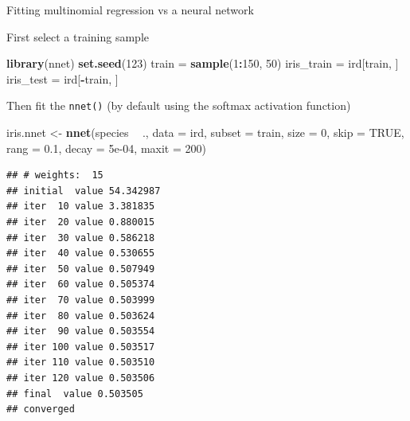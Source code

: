 \documentclass[10pt,ignorenonframetext,]{beamer}
\newenvironment{Shaded}{\begin{snugshade}}{\end{snugshade}}
\newcommand{\DataTypeTok}[1]{\textcolor[rgb]{0.13,0.29,0.53}{#1}}
\newcommand{\DecValTok}[1]{\textcolor[rgb]{0.00,0.00,0.81}{#1}}
\newcommand{\FloatTok}[1]{\textcolor[rgb]{0.00,0.00,0.81}{#1}}
\newcommand{\KeywordTok}[1]{\textcolor[rgb]{0.13,0.29,0.53}{\textbf{#1}}}
\newcommand{\NormalTok}[1]{#1}
\newcommand{\OperatorTok}[1]{\textcolor[rgb]{0.81,0.36,0.00}{\textbf{#1}}}
\newcommand{\OtherTok}[1]{\textcolor[rgb]{0.56,0.35,0.01}{#1}}
\newcommand{\StringTok}[1]{\textcolor[rgb]{0.31,0.60,0.02}{#1}}
\begin{document}
\begin{frame}[fragile]

\begin{block}{Fitting multinomial regression vs a neural network}

First select a training sample

\scriptsize

\begin{Shaded}
\begin{Highlighting}[]
\KeywordTok{library}\NormalTok{(nnet)}
\KeywordTok{set.seed}\NormalTok{(}\DecValTok{123}\NormalTok{)}
\NormalTok{train =}\StringTok{ }\KeywordTok{sample}\NormalTok{(}\DecValTok{1}\OperatorTok{:}\DecValTok{150}\NormalTok{, }\DecValTok{50}\NormalTok{)}
\NormalTok{iris_train =}\StringTok{ }\NormalTok{ird[train, ]}
\NormalTok{iris_test =}\StringTok{ }\NormalTok{ird[}\OperatorTok{-}\NormalTok{train, ]}
\end{Highlighting}
\end{Shaded}

\normalsize

Then fit the \texttt{nnet()} (by default using the softmax activation
function)

\scriptsize

\begin{Shaded}
\begin{Highlighting}[]
\NormalTok{iris.nnet <-}\StringTok{ }\KeywordTok{nnet}\NormalTok{(species }\OperatorTok{~}\StringTok{ }\NormalTok{., }\DataTypeTok{data =}\NormalTok{ ird, }\DataTypeTok{subset =}\NormalTok{ train, }\DataTypeTok{size =} \DecValTok{0}\NormalTok{, }
    \DataTypeTok{skip =} \OtherTok{TRUE}\NormalTok{, }\DataTypeTok{rang =} \FloatTok{0.1}\NormalTok{, }\DataTypeTok{decay =} \FloatTok{5e-04}\NormalTok{, }\DataTypeTok{maxit =} \DecValTok{200}\NormalTok{)}
\end{Highlighting}
\end{Shaded}

\begin{verbatim}
## # weights:  15
## initial  value 54.342987 
## iter  10 value 3.381835
## iter  20 value 0.880015
## iter  30 value 0.586218
## iter  40 value 0.530655
## iter  50 value 0.507949
## iter  60 value 0.505374
## iter  70 value 0.503999
## iter  80 value 0.503624
## iter  90 value 0.503554
## iter 100 value 0.503517
## iter 110 value 0.503510
## iter 120 value 0.503506
## final  value 0.503505 
## converged
\end{verbatim}

\end{block}

\end{frame}
\end{document}
